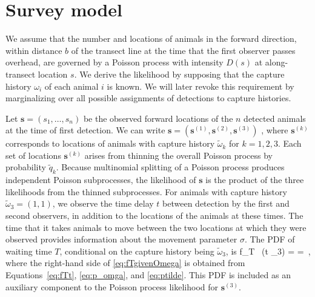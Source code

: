 \documentclass[useAMS, usenatbib, referee]{biom}\usepackage[]{graphicx}\usepackage[]{color}
\newcommand{\dotomega}{\tilde{\omega}}
\begin{document}
\section{Survey model}


We assume that the number and locations of animals in the forward direction, within distance $b$ of the transect line at the time that the first observer passes overhead, are governed by a Poisson process with intensity $D(s)$ at along-transect location $s$. We derive the likelihood by supposing that the capture history $\omega_i$ of each animal $i$ is known. We will later revoke this requirement by marginalizing over all possible assignments of detections to capture histories.


Let $\bm{s}=(s_1, \ldots, s_n)$ be the observed forward locations of the $n$ detected animals at the time of first detection. We can write $\bm{s}=\left(\bm{s}^{(1)}, \bm{s}^{(2)}, \bm{s}^{(3)}\right)$ , where $\bm{s}^{(k)}$ corresponds to locations of animals with capture history $\dotomega_k$ for $k=1, 2, 3$. Each set of locations $\bm{s}^{(k)}$ arises from thinning the overall Poisson process by probability $ \tilde{q}_{k}$. Because multinomial splitting of a Poisson process produces independent Poisson subprocesses, the likelihood of $\bm{s}$ is the product of the three likelihoods from the thinned subprocesses. For animals with capture history $\dotomega_3=(1,1)$, we observe the time delay $t$ between detection by the first and second observers, in addition to the locations of the animals at these times. The time that it takes animals to move between the two locations at which they were observed provides information about the movement parameter $\sigma$. The PDF of waiting time $T$, conditional on the capture history being $\dotomega_3$, is
\be
f_{T \mid \,\omega} (t \mid \dotomega_3) = \frac{f_T(t) \,\mathbb{P}(\dotomega_3 \mid t)}{\mathbb{P}(\dotomega_3)} =  \,,
\label{eq:fTgivenOmega}
\ee
where the right-hand side of \eqref{eq:fTgivenOmega} is obtained from Equations~\eqref{eq:fTt}, \eqref{eq:p_omga}, and \eqref{eq:ptilde}. This PDF is included as an auxiliary component to the Poisson process likelihood for $\bm{s}^{(3)}$.
\end{document}
